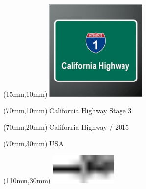 \null\newpage
\begin{textblock*}{50mm}(15mm,10mm)%
\includegraphics[width=50mm]{LG/2015-05-20_00077.png}
\end{textblock*}
\begin{textblock*}{130mm}(70mm,10mm)%
{\fontsize{20}{20}\selectfont California Highway Stage 3}\\
\end{textblock*}
\begin{textblock*}{120mm}(70mm,20mm)%
{\fontsize{16}{16}\selectfont California Highway / 2015}\\
\end{textblock*}
\begin{textblock*}{120mm}(70mm,30mm)%
{\fontsize{12}{12}\selectfont USA}
\end{textblock*}
\begin{textblock*}{30mm}(110mm,30mm)%
\centering
\includegraphics[height=15mm]{icons/tofinish.pdf}
\end{textblock*}
